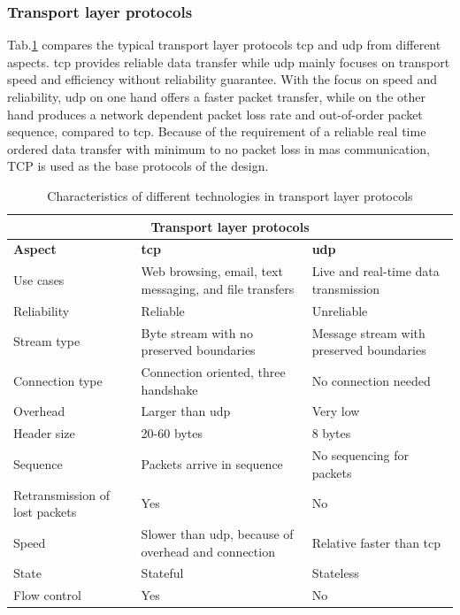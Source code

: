 \subsubsection{Transport layer protocols}
Tab.\ref{tab: transportlayer} compares the typical transport layer protocols \gls{tcp} and \gls{udp} from different aspects.  
\gls{tcp} provides reliable data transfer while \gls{udp} mainly focuses on transport speed and efficiency without reliability guarantee. 
With the focus on speed and reliability, \gls{udp} on one hand offers a faster packet transfer, while on the other hand produces a network dependent packet loss rate and out-of-order packet sequence, compared to \gls{tcp}. 
Because of the requirement of a reliable real time ordered data transfer with minimum to no packet loss in \gls{mas} communication, TCP is used as the base protocols of the design. 


\begin{table}[htbp]
    \small
    \centering
    \caption{Characteristics of different technologies in transport layer protocols}
    \label{tab: transportlayer}
    \begin{tabular}{|m{}|m{}|m{}|}
    \hline
    \multicolumn{3}{|c|}{\textbf{Transport layer protocols}}                                                            \\ \hline
    \textbf{Aspect}                         & \textbf{\gls{tcp}}             & \textbf{\gls{udp}}        \\ \hline
    Use cases                      & Web browsing, email, text messaging, and file transfers & Live and real-time data transmission \\ \hline
    Reliability                    & Reliable        & Unreliable \\ \hline
    Stream type                    & Byte stream with no preserved boundaries & Message stream with preserved boundaries \\ \hline
    Connection type                & Connection oriented, three handshake & No connection needed \\ \hline
    Overhead                       & Larger than \gls{udp} & Very low   \\ \hline
    Header size                    & 20-60 bytes     & 8 bytes    \\ \hline
    Sequence                       & Packets arrive in sequence & No sequencing for packets \\ \hline
    Retransmission of lost packets & Yes             & No         \\ \hline
    Speed                          & Slower than \gls{udp}, because of overhead and connection & Relative faster than \gls{tcp} \\ \hline
    State                          & Stateful        & Stateless  \\ \hline
    Flow control                   & Yes             & No         \\ \hline
    \end{tabular}
    \end{table}




